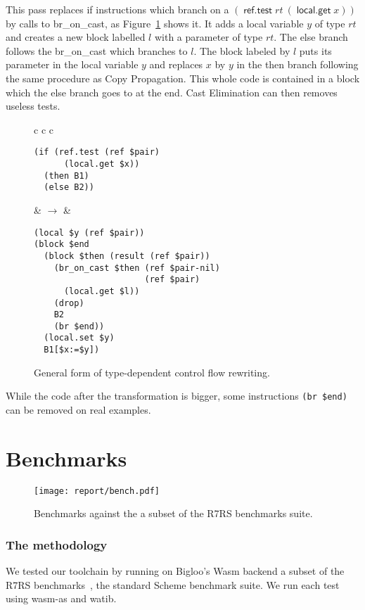 \documentclass[a4paper,11pt]{article}
\DeclareMathOperator{\reftest}{\textsf{ref.test}}
\DeclareMathOperator{\localget}{\textsf{local.get}}
\begin{document}
This pass replaces \textsf{if} instructions which branch on a $(\reftest
rt\ (\localget x))$ by calls to \textsf{br\_on\_cast}, as Figure~\ref{br} shows
it. It adds a local variable $y$ of type $rt$ and creates a new block labelled
$l$ with a parameter of type $rt$. The else branch follows the
\textsf{br\_on\_cast} which branches to $l$. The block labeled by $l$ puts its
parameter in the local variable $y$ and replaces $x$ by $y$ in the then branch
following the same procedure as Copy Propagation. This whole code is contained
in a block which the else branch goes to at the end. Cast Elimination can then
removes useless tests.

\begin{figure}[h!]
  \centering
  \begin{tabular}{c c c}
    \begin{minipage}{\widthof{\texttt{(if (ref.test (ref \$pair)}}}
\begin{verbatim}
(if (ref.test (ref $pair)
      (local.get $x))
  (then B1)
  (else B2))
\end{verbatim}
\end{minipage}
    &
    $\rightarrow$
    &
\begin{minipage}{\widthof{\texttt{....(br\_on\_cast \$then (ref \$pair-nil)}}}
\begin{verbatim}
(local $y (ref $pair))
(block $end
  (block $then (result (ref $pair))
    (br_on_cast $then (ref $pair-nil)
                      (ref $pair)
      (local.get $l))
    (drop)
    B2
    (br $end))
  (local.set $y)
  B1[$x:=$y])
\end{verbatim}
\end{minipage}
  \end{tabular}
  \caption{General form of type-dependent control flow rewriting.}\label{br}
\end{figure}

While the code after the transformation is bigger, some instructions \texttt{(br
  \$end)} can be removed on real examples.

\section{Benchmarks}\label{bench}
\begin{figure}[h!]
  \texttt{[image: report/bench.pdf]}
  \caption{Benchmarks against the a subset of the R7RS benchmarks suite.}\label{r7rs}
\end{figure}
\subsubsection{The methodology}
We tested our toolchain by running on Bigloo's Wasm backend a subset of the R7RS
benchmarks~\cite{r7rsbench}, the standard Scheme benchmark suite. We run each
test using \textsf{wasm-as} and \textsf{watib}.
\end{document}
